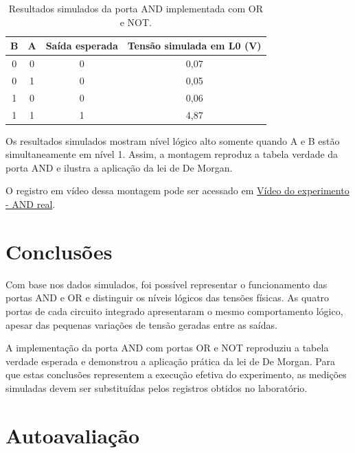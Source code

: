 \documentclass[12pt]{article}
\begin{document}
\begin{table}[H]
    \centering
    \caption{Resultados simulados da porta AND implementada com OR e NOT.}
    \label{tab:and-or-not}
    \begin{tabular}{|c|c|c|c|}
        \hline
        B & A & Saída esperada & Tensão simulada em L0 (V) \\
        \hline
        0 & 0 & 0 & 0,07 \\
        \hline
        0 & 1 & 0 & 0,05 \\
        \hline
        1 & 0 & 0 & 0,06 \\
        \hline
        1 & 1 & 1 & 4,87 \\
        \hline
    \end{tabular}
\end{table}

Os resultados simulados mostram nível lógico alto somente quando A e B estão
simultaneamente em nível 1. Assim, a montagem reproduz a tabela verdade da porta
AND e ilustra a aplicação da lei de De Morgan.

O registro em vídeo dessa montagem pode ser acessado em
\href{https://drive.google.com/file/d/1Nlw_ZkjOlQRgta15OaWYJaThIjsZHRao/view?usp=drivesdk}{Vídeo do experimento - AND real}.

\section{Conclusões}
\label{sec:conclusao}

Com base nos dados simulados, foi possível representar o funcionamento das
portas AND e OR e distinguir os níveis lógicos das tensões físicas. As quatro
portas de cada circuito integrado apresentaram o mesmo comportamento lógico,
apesar das pequenas variações de tensão geradas entre as saídas.

A implementação da porta AND com portas OR e NOT reproduziu a tabela verdade
esperada e demonstrou a aplicação prática da lei de De Morgan. Para que estas
conclusões representem a execução efetiva do experimento, as medições simuladas
devem ser substituídas pelos registros obtidos no laboratório.

\newpage
\section*{Autoavaliação}
\end{document}
